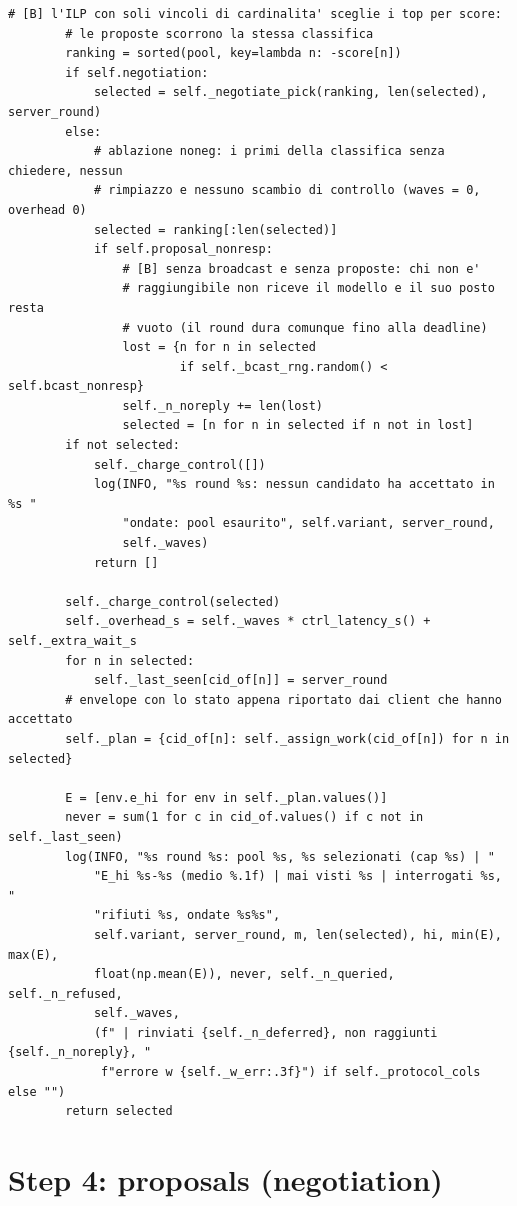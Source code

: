 \documentclass[11pt,a4paper]{article}
\begin{document}
\begin{lstlisting}[style=py,firstnumber=553,caption={\texttt{tesifl/strategies/sage\_smart.py}, lines 553--643}]
        # [B] l'ILP con soli vincoli di cardinalita' sceglie i top per score:
        # le proposte scorrono la stessa classifica
        ranking = sorted(pool, key=lambda n: -score[n])
        if self.negotiation:
            selected = self._negotiate_pick(ranking, len(selected), server_round)
        else:
            # ablazione noneg: i primi della classifica senza chiedere, nessun
            # rimpiazzo e nessuno scambio di controllo (waves = 0, overhead 0)
            selected = ranking[:len(selected)]
            if self.proposal_nonresp:
                # [B] senza broadcast e senza proposte: chi non e'
                # raggiungibile non riceve il modello e il suo posto resta
                # vuoto (il round dura comunque fino alla deadline)
                lost = {n for n in selected
                        if self._bcast_rng.random() < self.bcast_nonresp}
                self._n_noreply += len(lost)
                selected = [n for n in selected if n not in lost]
        if not selected:
            self._charge_control([])
            log(INFO, "%s round %s: nessun candidato ha accettato in %s "
                "ondate: pool esaurito", self.variant, server_round,
                self._waves)
            return []

        self._charge_control(selected)
        self._overhead_s = self._waves * ctrl_latency_s() + self._extra_wait_s
        for n in selected:
            self._last_seen[cid_of[n]] = server_round
        # envelope con lo stato appena riportato dai client che hanno accettato
        self._plan = {cid_of[n]: self._assign_work(cid_of[n]) for n in selected}

        E = [env.e_hi for env in self._plan.values()]
        never = sum(1 for c in cid_of.values() if c not in self._last_seen)
        log(INFO, "%s round %s: pool %s, %s selezionati (cap %s) | "
            "E_hi %s-%s (medio %.1f) | mai visti %s | interrogati %s, "
            "rifiuti %s, ondate %s%s",
            self.variant, server_round, m, len(selected), hi, min(E), max(E),
            float(np.mean(E)), never, self._n_queried, self._n_refused,
            self._waves,
            (f" | rinviati {self._n_deferred}, non raggiunti {self._n_noreply}, "
             f"errore w {self._w_err:.3f}") if self._protocol_cols else "")
        return selected
\end{lstlisting}

\newpage
\section{Step 4: proposals (negotiation)}
\label{sec:proposals}
\end{document}

